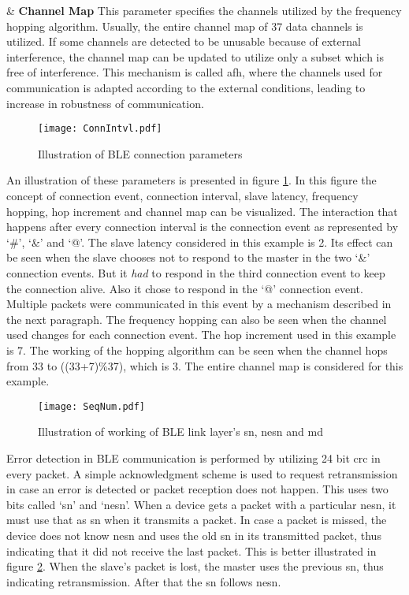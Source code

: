 \begin{easylist}[itemize]
& \textbf{Channel Map} \hspace{5pt} This parameter specifies the channels utilized by the frequency hopping algorithm. Usually, the entire channel map of 37 data channels is utilized. If some channels are detected to be unusable because of external interference, the channel map can be updated to utilize only a subset which is free of interference. This mechanism is called \gls{afh}, where the channels used for communication is adapted according to the external conditions, leading to increase in robustness of communication.
\end{easylist}

\begin{figure}[h]
\centering
\texttt{[image: ConnIntvl.pdf]}
\caption{Illustration of BLE connection parameters}
\label{fig:ConnIntvl}
\vspace{-5pt}
\end{figure}

An illustration of these parameters is presented in figure \ref{fig:ConnIntvl}. In this figure the concept of connection event, connection interval, slave latency, frequency hopping, hop increment and channel map can be visualized. The interaction that happens after every connection interval is the connection event as represented by `\#', `\&' and `@'. The slave latency considered in this example is 2. Its effect can be seen when the slave chooses not to respond to the master in the two `\&' connection events. But it \emph{had} to respond in the third connection event to keep the connection alive. Also it chose to respond in the `@' connection event. Multiple packets were communicated in this event by a mechanism described in the next paragraph. The frequency hopping can also be seen when the channel used changes for each connection event. The hop increment used in this example is 7. The working of the hopping algorithm can be seen when the channel hops from 33 to ((33+7)\%37), which is 3. The entire channel map is considered for this example. 


\begin{figure}[h]
\centering
\texttt{[image: SeqNum.pdf]}
\caption{Illustration of working of BLE link layer's \gls{sn}, \gls{nesn} and \acrshort{md}  \cite{Heydon2012}}
\label{fig:SeqNum}
\end{figure}

Error detection in BLE communication is performed by utilizing 24 bit \gls{crc} in every packet. A simple acknowledgment scheme is used to request retransmission in case an error is detected or packet reception does not happen. This uses two bits called `\gls{sn}' and `\gls{nesn}'. When a device gets a packet with a particular \gls{nesn},  it must use that as \gls{sn} when it transmits a packet. In case a packet is missed, the device does not know \gls{nesn} and uses the old \gls{sn} in its transmitted packet, thus indicating that it did not receive the last packet. This is better illustrated in figure \ref{fig:SeqNum}. When the slave's packet is lost, the master uses the previous \gls{sn}, thus indicating retransmission. After that the \gls{sn} follows \gls{nesn}.

